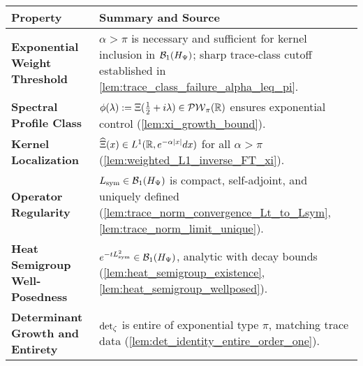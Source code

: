 \begin{center}
\renewcommand{\arraystretch}{1.4}
\begin{tabularx}{\textwidth}{|l|X|}
\hline
\textbf{Property} & \textbf{Summary and Source} \\
\hline
\textbf{Exponential Weight Threshold} & \( \alpha > \pi \) is necessary and sufficient for kernel inclusion in \( \mathcal{B}_1(H_{\Psi}) \); sharp trace-class cutoff established in \cref{lem:trace_class_failure_alpha_leq_pi}. \\
\textbf{Spectral Profile Class} & \( \phi(\lambda) := \Xi(\tfrac{1}{2} + i\lambda) \in \mathcal{PW}_{\pi}(\mathbb{R}) \) ensures exponential control (\cref{lem:xi_growth_bound}). \\
\textbf{Kernel Localization} & \( \widehat{\Xi}(x) \in L^1(\mathbb{R}, e^{-\alpha |x|} dx) \) for all \( \alpha > \pi \) (\cref{lem:weighted_L1_inverse_FT_xi}). \\
\textbf{Operator Regularity} & \( L_{\mathrm{sym}} \in \mathcal{B}_1(H_{\Psi}) \) is compact, self-adjoint, and uniquely defined (\cref{lem:trace_norm_convergence_Lt_to_Lsym}, \cref{lem:trace_norm_limit_unique}). \\
\textbf{Heat Semigroup Well-Posedness} & \( e^{-tL_{\mathrm{sym}}^2} \in \mathcal{B}_1(H_{\Psi}) \), analytic with decay bounds (\cref{lem:heat_semigroup_existence}, \cref{lem:heat_semigroup_wellposed}). \\
\textbf{Determinant Growth and Entirety} & \( \det\nolimits_{\zeta} \) is entire of exponential type \( \pi \), matching trace data (\cref{lem:det_identity_entire_order_one}). \\
\hline
\end{tabularx}
\end{center}

